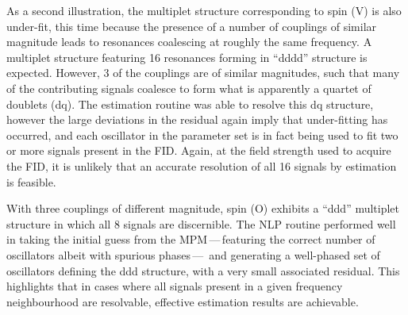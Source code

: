 As a second illustration, the multiplet structure corresponding to spin (V) is also
under-fit, this time because the presence of a number of couplings of similar
magnitude leads to resonances coalescing at roughly the same frequency. A
multiplet structure featuring 16 resonances forming in ``dddd'' structure is
expected. However, 3 of the couplings are of similar magnitudes, such that
many of the contributing signals coalesce to form what is apparently a quartet
of doublets (dq).
The estimation routine was able to resolve this dq structure,
however the large deviations in the residual again imply that under-fitting has
occurred, and each oscillator in the parameter set is in fact being used to fit
two or more signals present in the \ac{FID}. Again, at the field strength used
to acquire the \ac{FID}, it is unlikely that an accurate resolution of all 16
signals by estimation is feasible.

With three couplings of different magnitude, spin (O) exhibits a ``ddd''
multiplet structure in which all 8 signals are discernible. The \ac{NLP}
routine performed well in taking the initial guess from the
\ac{MPM}\,---\,featuring the correct number of oscillators albeit with
spurious phases\,---\, and generating a well-phased set of oscillators defining
the ddd structure, with a very small associated residual. This highlights that
in cases where all signals present in a given frequency neighbourhood are
resolvable, effective estimation results are achievable.

